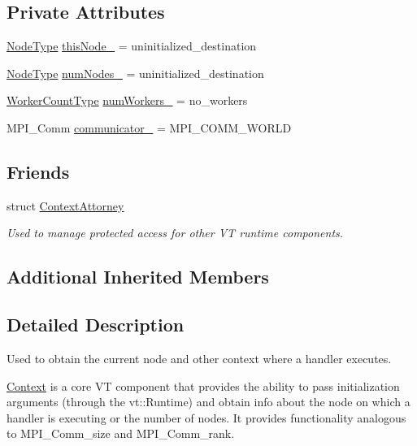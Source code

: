 \subsection*{Private Attributes}
\begin{DoxyCompactItemize}
\item 
\hyperlink{namespacevt_a866da9d0efc19c0a1ce79e9e492f47e2}{Node\+Type} \hyperlink{structvt_1_1ctx_1_1_context_a5fcea79d2fede6e9945433621894624c}{this\+Node\+\_\+} = uninitialized\+\_\+destination
\item 
\hyperlink{namespacevt_a866da9d0efc19c0a1ce79e9e492f47e2}{Node\+Type} \hyperlink{structvt_1_1ctx_1_1_context_a58cc20215314e915f43b829ad0470299}{num\+Nodes\+\_\+} = uninitialized\+\_\+destination
\item 
\hyperlink{namespacevt_aa93398ea48f2cb6c188512250f7cc248}{Worker\+Count\+Type} \hyperlink{structvt_1_1ctx_1_1_context_a16e8488c6e6ad26c387ad6ef19f726b9}{num\+Workers\+\_\+} = no\+\_\+workers
\item 
M\+P\+I\+\_\+\+Comm \hyperlink{structvt_1_1ctx_1_1_context_ac9f5afa2cb9a6c06c8570bbf25cde926}{communicator\+\_\+} = M\+P\+I\+\_\+\+C\+O\+M\+M\+\_\+\+W\+O\+R\+LD
\end{DoxyCompactItemize}
\subsection*{Friends}
\begin{DoxyCompactItemize}
\item 
struct \hyperlink{structvt_1_1ctx_1_1_context_a75c33a90ea59b21ab5375343af0f8e26}{Context\+Attorney}
\begin{DoxyCompactList}\small\item\em Used to manage protected access for other VT runtime components. \end{DoxyCompactList}\end{DoxyCompactItemize}
\subsection*{Additional Inherited Members}


\subsection{Detailed Description}
Used to obtain the current node and other context where a handler executes. 

\hyperlink{structvt_1_1ctx_1_1_context}{Context} is a core VT component that provides the ability to pass initialization arguments (through the {\ttfamily vt\+::\+Runtime}) and obtain info about the node on which a handler is executing or the number of nodes. It provides functionality analogous to {\ttfamily M\+P\+I\+\_\+\+Comm\+\_\+size} and {\ttfamily M\+P\+I\+\_\+\+Comm\+\_\+rank}. 

